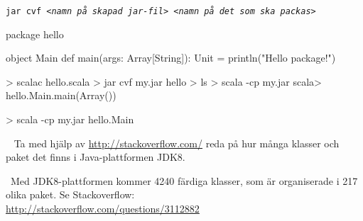\texttt{jar cvf \textit{<namn på skapad jar-fil> <namn på det som ska packas>}}

\SubtaskSolved
\begin{Code}
package hello

object Main {
  def main(args: Array[String]): Unit = println("Hello package!")
}
\end{Code}

\SubtaskSolved
\begin{REPL}
> scalac hello.scala
> jar cvf my.jar hello
> ls
> scala -cp my.jar
scala> hello.Main.main(Array())
\end{REPL}

\SubtaskSolved
\begin{REPL}
> scala -cp my.jar hello.Main
\end{REPL}

\QUESTEND





\QUESTBEGIN

\Task\Uberkurs \what~ Ta med hjälp av \url{http://stackoverflow.com/} reda på hur många klasser och paket det finns i Java-plattformen JDK8.

\SOLUTION

\TaskSolved \what~Med JDK8-plattformen kommer 4240 färdiga klasser, som är organiserade i 217 olika paket. Se Stackoverflow: \\\url{http://stackoverflow.com/questions/3112882}

\QUESTEND
